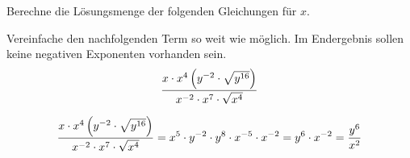\documentclass[12pt]{exam}
\begin{document}
\newpage
\begin{questions}
\question[3]
Berechne die Lösungsmenge der folgenden Gleichungen für $x$.
{\begin{solution}
\end{solution}}
{\vspace{5pt}\vfill}

\question[2]
Vereinfache den nachfolgenden Term so weit wie möglich. Im Endergebnis sollen keine negativen Exponenten vorhanden sein.
\[\frac{x\cdot x^4\left(y^{-2}\cdot\sqrt{y^{16}}\right)}{x^{-2}\cdot x^7\cdot\sqrt{x^4}}\]
{\begin{solution}
	\[\frac{x\cdot x^4\left(y^{-2}\cdot\sqrt{y^{16}}\right)}{x^{-2}\cdot x^7\cdot\sqrt{x^4}}=x^5\cdot y^{-2}\cdot y^8\cdot x^{-5}\cdot x^{-2}=y^6\cdot x^{-2}=\frac{y^6}{x^2}\]
\end{solution}}
{\vspace{5pt}\newpage}



\end{questions}
\end{document}
